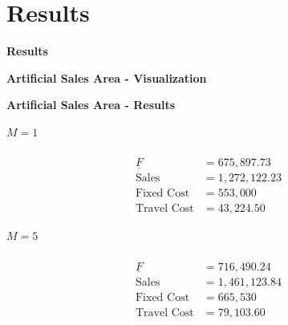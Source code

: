 \section{Results}
\begin{frame}
\begin{center}
{\LARGE \textbf{Results}}
\end{center}
\end{frame}


\begin{frame}{\textbf{Artificial Sales Area - Visualization}}
\begin{center}
    
\end{center}
\end{frame}

\begin{frame}{\textbf{Artificial Sales Area - Results}}
\begin{minipage}{0.48\linewidth}
\begin{center}
    $M = 1$\\[0.5em]
     \\[-0.5cm]
    \begin{align*}
    \underline{F}&=675,897.73 \\
    \text{Sales} &= 1,272,122.23 \\
    \text{Fixed Cost} &= 553,000 \\
    \text{Travel Cost} &= 43,224.50
    \end{align*}
    
\end{center}
\end{minipage}
\begin{minipage}{0.48\linewidth}
\begin{center}
    $M=5$ \\[0.5em]
     \\[-0.5cm]
    \begin{align*}
    \underline{F}&=716,490.24 \\
    \text{Sales} &= 1,461,123.84 \\
    \text{Fixed Cost} &= 665,530 \\
    \text{Travel Cost} &= 79,103.60
    \end{align*}
\end{center}
\end{minipage}
\end{frame}

